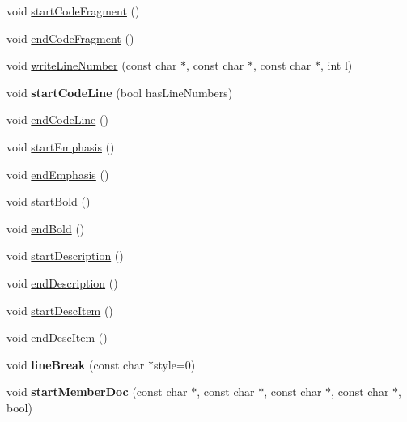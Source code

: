 \begin{DoxyCompactItemize}
\item 
void \hyperlink{class_latex_generator_a631953fed580c2b82e39426604c928ac}{start\-Code\-Fragment} ()
\item 
void \hyperlink{class_latex_generator_a0d97d57c34ed239bcf916104a71e10bf}{end\-Code\-Fragment} ()
\item 
void \hyperlink{class_latex_generator_a041516b65f9f2c22d2c0941419200cbb}{write\-Line\-Number} (const char $\ast$, const char $\ast$, const char $\ast$, int l)
\item 
\hypertarget{class_latex_generator_a87ce1b5dc3773f8bb8c74ca64d99022f}{void {\bfseries start\-Code\-Line} (bool has\-Line\-Numbers)}\label{class_latex_generator_a87ce1b5dc3773f8bb8c74ca64d99022f}

\item 
void \hyperlink{class_latex_generator_adbe51a89cf6f9573b3434e7cfda81a7c}{end\-Code\-Line} ()
\item 
void \hyperlink{class_latex_generator_ab2f79d1f1a30e329f7ada3e51c04917e}{start\-Emphasis} ()
\item 
void \hyperlink{class_latex_generator_a5c4adfb425dee0e192e5b606eab0114a}{end\-Emphasis} ()
\item 
void \hyperlink{class_latex_generator_a6f230bea6c80b0a1847a9608c88fd45a}{start\-Bold} ()
\item 
void \hyperlink{class_latex_generator_a1e1a209879148bfcb4b57ab294b37b90}{end\-Bold} ()
\item 
void \hyperlink{class_latex_generator_ae87205938a124b2eac0d798631d4e5e6}{start\-Description} ()
\item 
void \hyperlink{class_latex_generator_a5a0a6eb710a6b87c5dd8ea82b7a19dc4}{end\-Description} ()
\item 
void \hyperlink{class_latex_generator_ab8a6797fe2e4cb968a4c13eea7c4c968}{start\-Desc\-Item} ()
\item 
void \hyperlink{class_latex_generator_a080b8f2fa36e665da60bcfa982386ac8}{end\-Desc\-Item} ()
\item 
\hypertarget{class_latex_generator_a8c56a0949062c0b6a199c9d9f16a67a5}{void {\bfseries line\-Break} (const char $\ast$style=0)}\label{class_latex_generator_a8c56a0949062c0b6a199c9d9f16a67a5}

\item 
\hypertarget{class_latex_generator_ad767ef57c71199afc7cd587b07bf36c8}{void {\bfseries start\-Member\-Doc} (const char $\ast$, const char $\ast$, const char $\ast$, const char $\ast$, bool)}\label{class_latex_generator_ad767ef57c71199afc7cd587b07bf36c8}


\end{DoxyCompactItemize}
